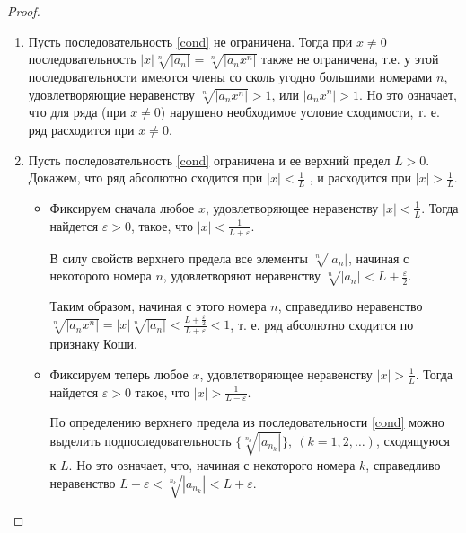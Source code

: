 \begin{proof}
\begin{enumerate}
    \item Пусть последовательность \ref{cond} не ограничена. Тогда при $x \neq 0$ последовательность $|x|\sqrt[n]{|a_n|} = \sqrt[n]{|a_n x^n|}$
    также не ограничена, т.е. у этой последовательности имеются члены со сколь угодно большими номерами $n$, удовлетворяющие неравенству $\sqrt[n]{|a_n x^n|} > 1$, или $|a_n x^n| > 1$.
    Но это означает, что для ряда (при $x\neq 0$) нарушено необходимое условие сходимости, т. е. ряд расходится при $x\neq 0$.
    \item Пусть последовательность \ref{cond} ограничена и ее верхний предел $L > 0$. Докажем, что ряд абсолютно сходится при $|x| < \frac{1}{L}$ , и расходится при $|x| > \frac{1}{L}$.
    \begin{itemize}
        \item Фиксируем сначала любое $x$, удовлетворяющее неравенству $|x| < \frac{1}{L}$. Тогда найдется $\varepsilon > 0$, такое, что $|x| < \frac{1}{L+\varepsilon}$.

        В силу свойств верхнего предела все элементы $\sqrt[n]{|a_n|}$, начиная с некоторого номера $n$, удовлетворяют неравенству $\sqrt[n]{|a_n|} < L + \frac{\varepsilon}{2}$.

        Таким образом, начиная с этого номера $n$, справедливо неравенство $\sqrt[n]{|a_n x^n|} = |x|\sqrt[n]{|a_n|} < \frac{L + \frac{\varepsilon}{2}}{L+\varepsilon} < 1$, т. е. ряд абсолютно сходится по признаку Коши.
        \item Фиксируем теперь любое $x$, удовлетворяющее неравенству $|x| > \frac{1}{L}$. Тогда найдется $\varepsilon > 0$ такое, что $|x| > \frac{1}{L - \varepsilon}$.

        По определению верхнего предела из последовательности \ref{cond} можно выделить подпоследовательность $\{\sqrt[n_k]{|a_{n_k}|}\},~(k=1,2,\dots)$, сходящуюся к $L$.
        Но это означает, что, начиная с некоторого номера $k$, справедливо неравенство $L-\varepsilon< \sqrt[n_k]{|a_{n_k}|} <L+\varepsilon$.


\end{itemize}
\end{enumerate}
\end{proof}
